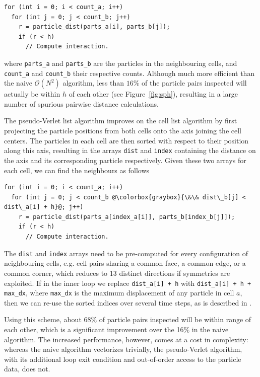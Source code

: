 \documentclass{IOS-Book-Article}
\begin{document}
\begin{lstlisting}[caption={Simple iteration over neighbours.}, label=code:naive_pair]
for (int i = 0; i < count_a; i++)
  for (int j = 0; j < count_b; j++)
    r = particle_dist(parts_a[i], parts_b[j]);
    if (r < h)
      // Compute interaction.
\end{lstlisting}

\noindent where {\tt parts\_a} and {\tt parts\_b} are the particles in the neighbouring cells, and {\tt count\_a} and {\tt count\_b} their respective counts. Although much more efficient than the naive $\mathcal{O}(N^2)$ algorithm, less than $16\%$ of the particle pairs inspected will actually be within $h$ of each other (see Figure~\ref{fig:sph}), resulting in a large number of spurious pairwise distance calculations.

The pseudo-Verlet list algorithm \cite{ref:PG_Pseudo_Verlet_list} improves on the cell list algorithm by first projecting the particle positions from both cells onto the axis joining the cell centers. The particles in each cell are then sorted with respect to their position along this axis, resulting in the arrays {\tt dist} and {\tt index} containing the distance on the axis and its corresponding particle respectively. Given these two arrays for each cell, we can find the neighbours as follows

\begin{lstlisting}[caption={Pseudo-Verlet list iteration over neighbours.}, label=code:scalar_verlet_list]
for (int i = 0; i < count_a; i++)
  for (int j = 0; j < count_b @\colorbox{graybox}{\&\& dist\_b[j] < dist\_a[i] + h}@; j++)
    r = particle_dist(parts_a[index_a[i]], parts_b[index_b[j]]);
    if (r < h)
      // Compute interaction.
\end{lstlisting}

The {\tt dist} and {\tt index} arrays need to be pre-computed for every configuration of neighbouring cells, e.g. cell pairs sharing a common face, a common edge, or a common corner, which reduces to 13 distinct directions if symmetries are exploited. If in the inner loop we replace {\tt dist\_a[i] + h} with {\tt dist\_a[i] + h + max\_dx}, where {\tt max\_dx} is the maximum displacement of any particle in cell $a$, then we can re-use the sorted indices over several time steps, as is described in \cite{ref:PG_Pseudo_Verlet_list}.

Using this scheme, about 68\% of particle pairs inspected will be within range of each other, which is a significant improvement over the 16\% in the naive algorithm. The increased performance, however, comes at a cost in complexity: whereas the naive algorithm vectorizes trivially, the pseudo-Verlet algorithm, with its additional loop exit condition and out-of-order access to the particle data, does not.
\end{document}
